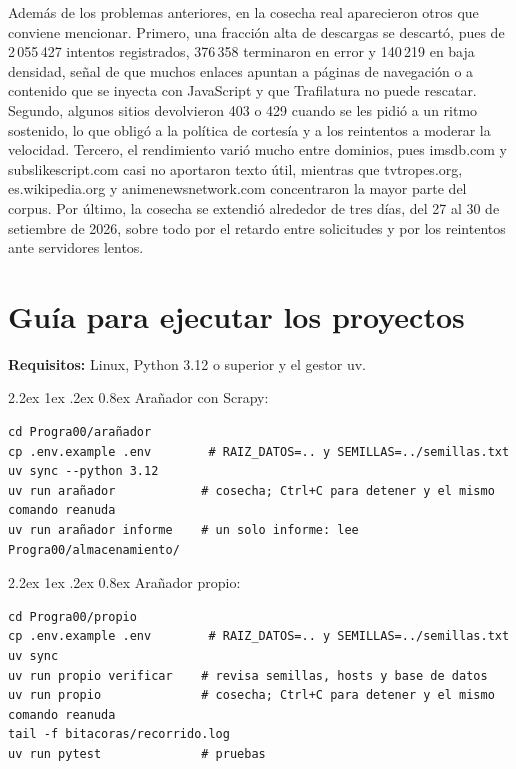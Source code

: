 \documentclass[11pt,spanish]{article}
\makeatletter
\renewcommand\paragraph{\@startsection{paragraph}{4}{\z@}%
  {2.2ex \@plus1ex \@minus.2ex}%
  {0.8ex}%
  {\normalfont\normalsize\bfseries}}
\makeatother
\begin{document}
Además de los problemas anteriores, en la cosecha real aparecieron otros que conviene mencionar. Primero, una fracción alta de descargas se descartó, pues de 2\,055\,427 intentos registrados, 376\,358 terminaron en error y 140\,219 en baja densidad, señal de que muchos enlaces apuntan a páginas de navegación o a contenido que se inyecta con JavaScript y que Trafilatura no puede rescatar. Segundo, algunos sitios devolvieron 403 o 429 cuando se les pidió a un ritmo sostenido, lo que obligó a la política de cortesía y a los reintentos a moderar la velocidad. Tercero, el rendimiento varió mucho entre dominios, pues imsdb.com y subslikescript.com casi no aportaron texto útil, mientras que tvtropes.org, es.wikipedia.org y animenewsnetwork.com concentraron la mayor parte del corpus. Por último, la cosecha se extendió alrededor de tres días, del 27 al 30 de setiembre de 2026, sobre todo por el retardo entre solicitudes y por los reintentos ante servidores lentos.

\section{Guía para ejecutar los proyectos}

\textbf{Requisitos:} Linux, Python 3.12 o superior y el gestor uv.

\paragraph{Arañador con Scrapy:}

\begin{lstlisting}
cd Progra00/arañador
cp .env.example .env        # RAIZ_DATOS=.. y SEMILLAS=../semillas.txt
uv sync --python 3.12
uv run arañador            # cosecha; Ctrl+C para detener y el mismo comando reanuda
uv run arañador informe    # un solo informe: lee Progra00/almacenamiento/
\end{lstlisting}

\paragraph{Arañador propio:}

\begin{lstlisting}
cd Progra00/propio
cp .env.example .env        # RAIZ_DATOS=.. y SEMILLAS=../semillas.txt
uv sync
uv run propio verificar    # revisa semillas, hosts y base de datos
uv run propio              # cosecha; Ctrl+C para detener y el mismo comando reanuda
tail -f bitacoras/recorrido.log
uv run pytest              # pruebas
\end{lstlisting}
\end{document}
